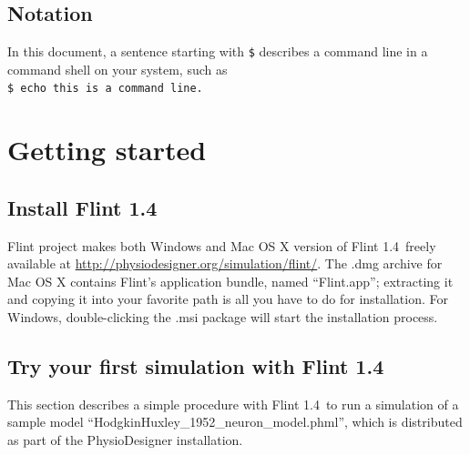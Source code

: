 \documentclass[a4paper,10pt]{report}
\def\FlintVersion{1.4}
\def\Flint{Flint \FlintVersion}
\begin{document}
\section{Notation}
In this document, a sentence starting with {\tt \$} describes a command line in
a command shell on your system, such as\\
{\tt \$ echo this is a command line.}



\chapter{Getting started}

\section{Install \Flint}
Flint project makes both Windows and Mac OS X version of \Flint\ freely
available at \url{http://physiodesigner.org/simulation/flint/}.
The .dmg archive for Mac OS X contains Flint's application bundle, named
``Flint.app''; extracting it and copying it into your favorite path is all
you have to do for installation.
For Windows, double-clicking the .msi package will start the installation
process.

\section{Try your first simulation with \Flint}
This section describes a simple procedure with \Flint\ to run a simulation of a
sample model ``HodgkinHuxley\_1952\_neuron\_model.phml'', which is distributed
as part of the PhysioDesigner installation.
\end{document}
